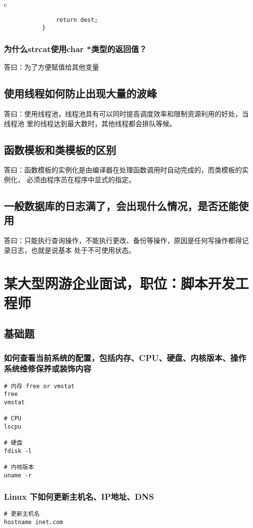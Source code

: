 \documentclass{article}
\begin{document}
\begin{mitned}{c}
\begin{verbatim}
               return dest;
           }

\end{verbatim}
\subsubsection{为什么strcat使用char *类型的返回值？}
答曰：为了方便赋值给其他变量

\subsection{使用线程如何防止出现大量的波峰}
答曰：使用线程池，线程池具有可以同时提高调度效率和限制资源利用的好处，当线程池
里的线程达到最大数时，其他线程都会排队等候。

\subsection{函数模板和类模板的区别}
答曰：函数模板的实例化是由编译器在处理函数调用时自动完成的，而类模板的实例化，
必须由程序员在程序中显式的指定。

\subsection{一般数据库的日志满了，会出现什么情况，是否还能使用}
答曰：只能执行查询操作，不能执行更改、备份等操作，原因是任何写操作都得记录日志，也就是说基本
处于不可使用状态。


\section{某大型网游企业面试，职位：脚本开发工程师}
\subsection{基础题}
\subsubsection{如何查看当前系统的配置，包括内存、CPU、硬盘、内核版本、操作系统维修保养或装饰内容}
\begin{verbatim}
# 内存 free or vmstat
free
vmstat

# CPU
lscpu

# 硬盘
fdisk -l

# 内核版本 
uname -r
\end{verbatim}

\subsubsection{Linux 下如何更新主机名、IP地址、DNS}
\begin{verbatim}
# 更新主机名
hostname inet.com


\end{verbatim}
\end{mitned}
\end{document}
